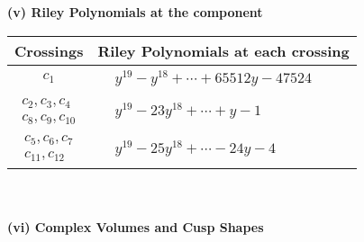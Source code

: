 \documentclass[1p]{elsarticle_modified}
\theoremstyle{definition}
\begin{document}
\newpage\renewcommand{\arraystretch}{1}
\flushleft \textbf{(v) Riley Polynomials at the component}\newline \\
\begin{tabular}{m{50pt}|m{274pt}}
Crossings & \hspace{64pt}Riley Polynomials at each crossing \\
\hline $$\begin{aligned}c_{1}\end{aligned}$$&$\begin{aligned}
&y^{19}- y^{18}+\cdots+65512 y-47524
\end{aligned}$\\
\hline $$\begin{aligned}c_{2},c_{3},c_{4}\\c_{8},c_{9},c_{10}\end{aligned}$$&$\begin{aligned}
&y^{19}-23 y^{18}+\cdots+y-1
\end{aligned}$\\
\hline $$\begin{aligned}c_{5},c_{6},c_{7}\\c_{11},c_{12}\end{aligned}$$&$\begin{aligned}
&y^{19}-25 y^{18}+\cdots-24 y-4
\end{aligned}$\\
\hline
\end{tabular}\\~\\
\newpage\flushleft \textbf{(vi) Complex Volumes and Cusp Shapes}
\end{document}
